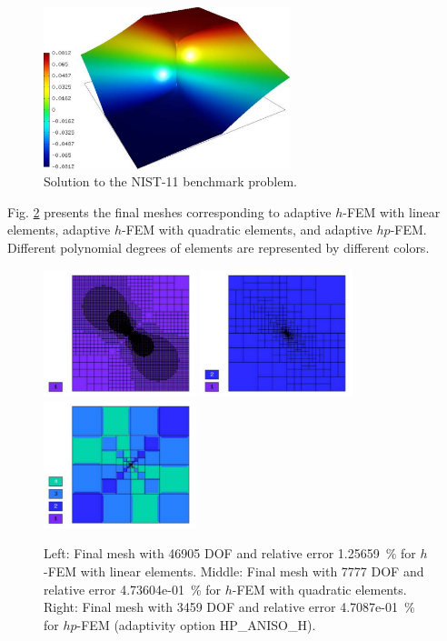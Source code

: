 \documentclass[12pt]{elsarticle}
\begin{document}
\begin{figure}[H]
\centering
\includegraphics[height=4.7cm]{mafig65.pdf}
\caption{Solution to the NIST-11 benchmark problem.}
\label{fig:sln-nist11}
\end{figure}

Fig. \ref{fig:nist-11-hp-aniso} presents the final meshes corresponding to adaptive $h$-FEM with
linear elements, adaptive $h$-FEM with quadratic elements, and adaptive $hp$-FEM. Different
polynomial degrees of elements are represented by different colors.

\begin{figure}[H]
\centering
\includegraphics[height=3.7cm]{mafig66.pdf}
\includegraphics[height=3.7cm]{mafig67.pdf}
\includegraphics[height=3.7cm]{mafig68.pdf}
\caption{
Left: Final mesh with 46905 DOF and relative error 1.25659~\% for $h$-FEM with linear elements.
Middle: Final mesh with 7777 DOF and relative error 4.73604e-01~\% for $h$-FEM with quadratic elements.
Right: Final mesh with 3459 DOF and relative error 4.7087e-01~\% for $hp$-FEM (adaptivity option HP\_ANISO\_H).}
\label{fig:nist-11-hp-aniso}
\end{figure}
\end{document}
